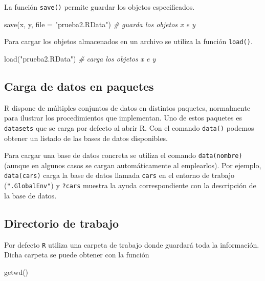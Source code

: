 \documentclass[
]{book}
\newenvironment{Shaded}{\begin{snugshade}}{\end{snugshade}}
\newcommand{\AttributeTok}[1]{\textcolor[rgb]{0.77,0.63,0.00}{#1}}
\newcommand{\CommentTok}[1]{\textcolor[rgb]{0.56,0.35,0.01}{\textit{#1}}}
\newcommand{\FunctionTok}[1]{\textcolor[rgb]{0.00,0.00,0.00}{#1}}
\newcommand{\NormalTok}[1]{#1}
\newcommand{\StringTok}[1]{\textcolor[rgb]{0.31,0.60,0.02}{#1}}
\theoremstyle{break}
\theoremstyle{nonumberplain}
\begin{document}
La función \texttt{save()} permite guardar los objetos especificados.

\begin{Shaded}
\begin{Highlighting}[]
\FunctionTok{save}\NormalTok{(x, y, }\AttributeTok{file =} \StringTok{"prueba2.RData"}\NormalTok{) }\CommentTok{\# guarda los objetos x e y}
\end{Highlighting}
\end{Shaded}

Para cargar los objetos almacenados en un archivo se utiliza la función \texttt{load()}.

\begin{Shaded}
\begin{Highlighting}[]
\FunctionTok{load}\NormalTok{(}\StringTok{"prueba2.RData"}\NormalTok{) }\CommentTok{\# carga los objetos x e y}
\end{Highlighting}
\end{Shaded}

\hypertarget{data-paquetes}{%
\subsection{Carga de datos en paquetes}\label{data-paquetes}}

R dispone de múltiples conjuntos de datos en distintos paquetes, normalmente para ilustrar los procedimientos que implementan.
Uno de estos paquetes es \texttt{datasets} que se carga por defecto al abrir R.
Con el comando \texttt{data()} podemos obtener un listado de las bases de datos disponibles.

Para cargar una base de datos concreta se utiliza el comando
\texttt{data(nombre)} (aunque en algunos casos se cargan automáticamente al emplearlos).
Por ejemplo, \texttt{data(cars)} carga la base de datos llamada \texttt{cars} en el entorno de trabajo (\texttt{".GlobalEnv"}) y \texttt{?cars} muestra la ayuda correspondiente con la descripción de la base de datos.

\hypertarget{directorio-de-trabajo}{%
\subsection{Directorio de trabajo}\label{directorio-de-trabajo}}

Por defecto \texttt{R} utiliza una carpeta de trabajo donde guardará toda la información.
Dicha carpeta se puede obtener con la función

\begin{Shaded}
\begin{Highlighting}[]
\FunctionTok{getwd}\NormalTok{() }
\end{Highlighting}
\end{Shaded}
\end{document}
